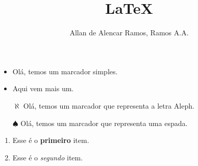 \documentclass[12pt, a4paper]{article}
\begin{document}
\title{LaTeX}
\author{Allan de Alencar Ramos, Ramos A.A.}
\maketitle

\begin{itemize}
	\item Olá, temos um marcador simples.
	\item Aqui vem mais um.
\end{itemize}

\begin{itemize}
	\item[$\aleph$] Olá, temos um marcador que representa a letra Aleph.
	\item[$\spadesuit$] Olá, temos um marcador que representa uma espada.
\end{itemize}

\begin{enumerate}
	\item Esse é o \textbf{primeiro} item.
	\item Esse é o \textit{segundo} item.
\end{enumerate}
\end{document}
